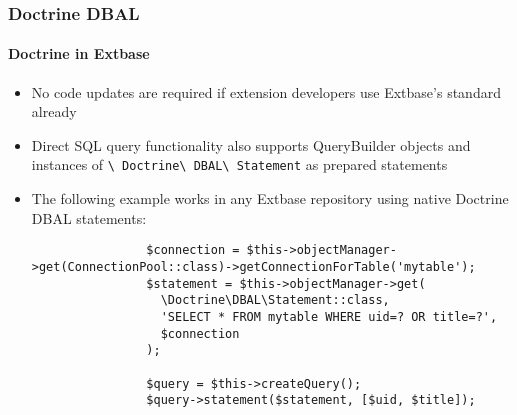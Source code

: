 \begin{frame}[fragile]
	\frametitle{Doctrine DBAL}
	\framesubtitle{Doctrine in Extbase}

	\lstset{basicstyle=\tiny\ttfamily}

	\begin{itemize}
		\item No code updates are required if extension developers use
			Extbase's standard already

		\item Direct SQL query functionality also supports QueryBuilder objects and instances of
			\texttt{\textbackslash
			Doctrine\textbackslash
			DBAL\textbackslash
			Statement} as prepared statements

		\item The following example works in any Extbase repository using native Doctrine DBAL statements:

			\begin{lstlisting}
				$connection = $this->objectManager->get(ConnectionPool::class)->getConnectionForTable('mytable');
				$statement = $this->objectManager->get(
				  \Doctrine\DBAL\Statement::class,
				  'SELECT * FROM mytable WHERE uid=? OR title=?',
				  $connection
				);

				$query = $this->createQuery();
				$query->statement($statement, [$uid, $title]);
			\end{lstlisting}
	\end{itemize}

\end{frame}

